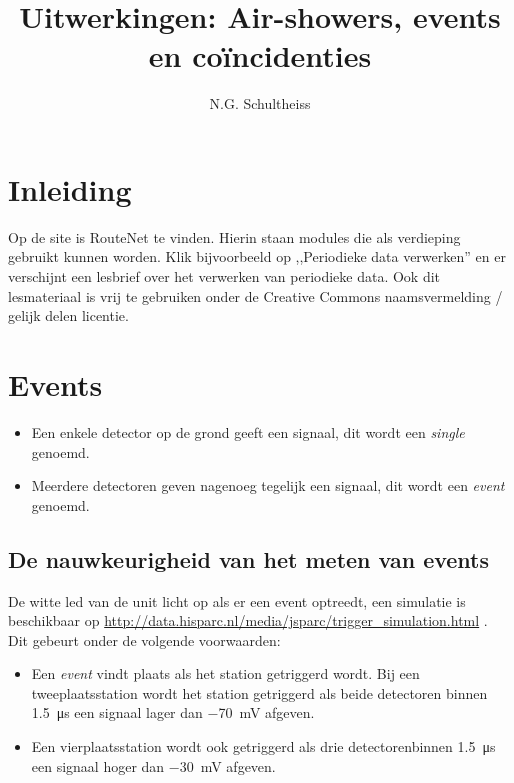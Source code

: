



\title{Uitwerkingen: Air-showers, events en coïncidenties}
\author{N.G. Schultheiss}

\maketitle

\section{Inleiding}

Op de \hisparc site is RouteNet te vinden. Hierin staan modules die
als verdieping gebruikt kunnen worden. Klik bijvoorbeeld op ,,Periodieke
data verwerken'' en er verschijnt een lesbrief over het verwerken
van periodieke data. Ook dit lesmateriaal is vrij te gebruiken onder
de Creative Commons naamsvermelding / gelijk delen licentie.


\section{Events}

\begin{itemize}
    \item Een enkele detector op de grond geeft een signaal, dit wordt
    een \emph{single} genoemd. 
    \item Meerdere detectoren geven nagenoeg tegelijk een signaal, dit
    wordt een \emph{event} genoemd. 
\end{itemize}

\subsection{De nauwkeurigheid van het meten van events}

De witte led van de \hisparc unit licht op als er een event optreedt,
een simulatie is beschikbaar op
\url{http://data.hisparc.nl/media/jsparc/trigger_simulation.html} . Dit
gebeurt onder de volgende voorwaarden:

\begin{itemize}
    \item Een \textit{event} vindt plaats als het station getriggerd
    wordt. Bij een tweeplaatsstation wordt het station getriggerd als
    beide detectoren binnen \SI{1,5}{\micro\second} een signaal lager
    dan \SI{-70}{\milli\volt} afgeven. 
    \item Een vierplaatsstation wordt ook getriggerd als drie
    detectorenbinnen \SI{1,5}{\micro\second} een signaal hoger dan
    \SI{-30}{\milli\volt} afgeven. 
\end{itemize}

